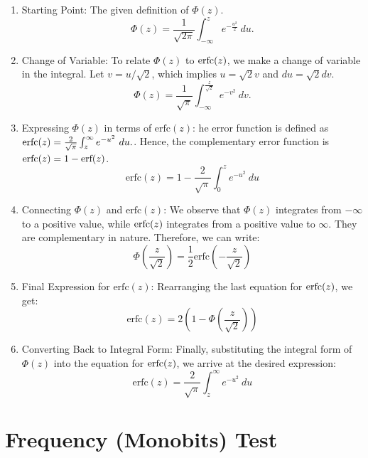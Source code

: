\documentclass[12pt,openany]{book}
\theoremstyle{definition}
\begin{document}
	\begin{enumerate}[(1)]
		\item Starting Point: The given definition of $\Phi(z)$.
		\[
		\Phi(z) = \frac{1}{\sqrt{2\pi}}\int_{-\infty}^{z} e^{-\frac{u^2}{2}}\ du.
		\]
		\item Change of Variable:  To relate 
		$\Phi(z)$ to 
		$\textnormal{erfc}
		(z)$, we make a change of variable in the integral. Let 
		$v=u/\sqrt{2}$, which implies 
		$u=\sqrt{2}v$ and 
		$du=\sqrt{2}dv$. \[
			\Phi(z) = \frac{1}{\sqrt{\pi}}\int_{-\infty}^{\frac{z}{\sqrt{2}}} e^{-v^2}\ dv.
			\]
		\item Expressing \(\Phi(z)\) in terms of \(\text{erfc}(z)\): he error function is defined as $\textnormal{erfc}(z)=\frac{2}{\sqrt{\pi}}\int_{z}^{\infty}e^{-u^2}\ du.$. Hence, the complementary error function is 
		$\textnormal{erfc}(z)=1-\textnormal{erf}(z)$.
		\[
			\text{erfc}(z) = 1 - \frac{2}{\sqrt{\pi}}\int_{0}^{z} e^{-u^2}\ du
		\]
		\item Connecting \(\Phi(z)\) and \(\text{erfc}(z)\): We observe that 
		$\Phi(z)$ integrates from 
		$-\infty$ to a positive value, while 
		$\textnormal{erfc}(z)$ integrates from a positive value to 
		$\infty$. They are complementary in nature. Therefore, we can write:
		\[
			\Phi\left(\frac{z}{\sqrt{2}}\right) = \frac{1}{2} \text{erfc}\left(-\frac{z}{\sqrt{2}}\right)
		\]
		\item Final Expression for \(\text{erfc}(z)\): Rearranging the last equation for 
		$\textnormal{erfc}(z)$, we get:
		\[
			\text{erfc}(z) = 2 \left( 1 - \Phi\left(\frac{z}{\sqrt{2}}\right) \right)
		\]
		\item Converting Back to Integral Form:
		Finally, substituting the integral form of 
		$\Phi(z)$ into the equation for 
		$\textnormal{erfc}(z)$, we arrive at the desired expression:
		\[
			\text{erfc}(z) = \frac{2}{\sqrt{\pi}}\int_{z}^{\infty}e^{-u^2}\ du
		\]
	\end{enumerate}
	
	\newpage
	\section{Frequency (Monobits) Test}
	
\end{document}
